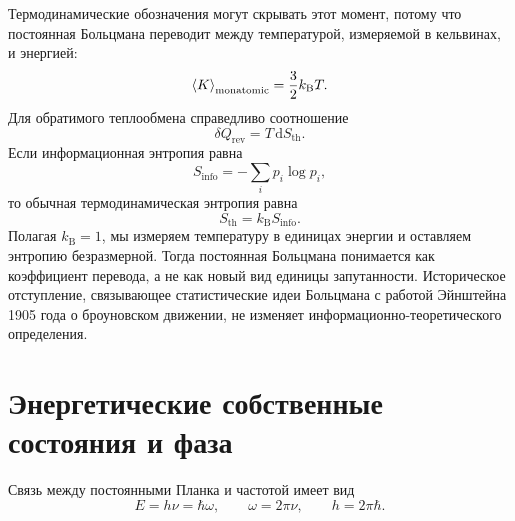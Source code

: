 Термодинамические обозначения могут скрывать этот момент, потому что постоянная Больцмана переводит между температурой, измеряемой в кельвинах, и энергией:
\begin{equation}
\left\langle K\right\rangle_{\mathrm{monatomic}}
=\frac32 k_{\mathrm B}T.
\end{equation}
Для обратимого теплообмена справедливо соотношение
\begin{equation}
\delta Q_{\mathrm{rev}}=T\,\mathrm dS_{\mathrm{th}}.
\end{equation}
Если информационная энтропия равна
\begin{equation}
S_{\mathrm{info}}=-\sum_i p_i\log p_i,
\end{equation}
то обычная термодинамическая энтропия равна
\begin{equation}
S_{\mathrm{th}}=k_{\mathrm B}S_{\mathrm{info}}.
\end{equation}
Полагая \(k_{\mathrm B}=1\), мы измеряем температуру в единицах энергии и оставляем энтропию безразмерной. Тогда постоянная Больцмана понимается как коэффициент перевода, а не как новый вид единицы запутанности. Историческое отступление, связывающее статистические идеи Больцмана с работой Эйнштейна 1905 года о броуновском движении, не изменяет информационно-теоретического определения.

\section{Энергетические собственные состояния и фаза}

\begin{classroomqa}
\end{classroomqa}

Связь между постоянными Планка и частотой имеет вид
\begin{equation}
E=h\nu=\hbar\omega,
\qquad
\omega=2\pi\nu,
\qquad
h=2\pi\hbar.
\end{equation}


